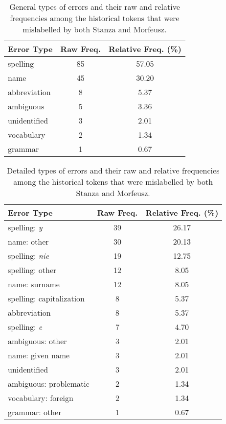 \renewcommand{\arraystretch}{1.25}
\begin{table}[H]
\begin{center}
\begin{tabular}{|l|cc|}
\hline \bf Error Type & \bf Raw Freq. & \bf Relative Freq. (\%) \\ \hline
spelling & 85 & 57.05  \\
name & 45 & 30.20  \\
abbreviation & 8 & 5.37 \\
ambiguous & 5 & 3.36 \\
unidentified & 3 & 2.01 \\
vocabulary & 2 & 1.34 \\
grammar & 1 & 0.67 \\
\hline
\end{tabular}
\caption{\label{table:general-lemmas-errors} General types of errors and their raw and relative frequencies among the historical tokens that were mislabelled by both Stanza and Morfeusz.}
\end{center}
\end{table}

\renewcommand{\arraystretch}{1.25}
\begin{table}[h]
\begin{center}
\begin{tabular}{|l|cc|}
\hline \bf Error Type & \bf Raw Freq. & \bf Relative Freq. (\%) \\ \hline
spelling: \textit{y} & 39 & 26.17  \\
name: other & 30 & 20.13  \\
spelling: \textit{nie} & 19 & 12.75  \\
spelling: other & 12 & 8.05 \\ 
name: surname & 12 & 8.05 \\
spelling: capitalization & 8 & 5.37 \\
abbreviation & 8 & 5.37 \\
spelling: \textit{e} & 7 & 4.70 \\
ambiguous: other & 3 & 2.01 \\
name: given name & 3 & 2.01 \\
unidentified & 3 & 2.01 \\
ambiguous: problematic & 2 & 1.34 \\
vocabulary: foreign & 2 & 1.34 \\
grammar: other & 1 & 0.67 \\
\hline
\end{tabular}
\caption{\label{table:lemmas-errors} Detailed types of errors and their raw and relative frequencies among the historical tokens that were mislabelled by both Stanza and Morfeusz.}
\end{center}
\end{table}

